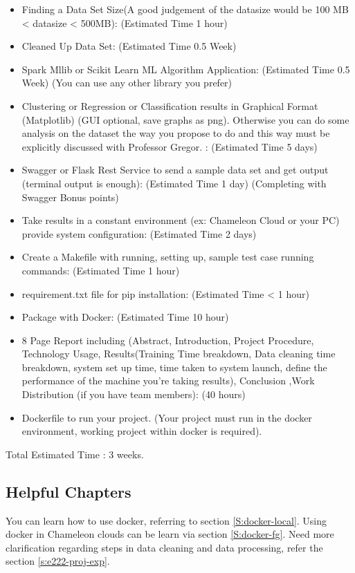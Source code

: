 \begin{itemize}
\item Finding a Data Set Size(A good judgement of the datasize would
  be 100 MB < datasize < 500MB): (Estimated Time 1 hour)
\item Cleaned Up Data Set: (Estimated Time 0.5 Week)
\item Spark Mllib or Scikit Learn ML Algorithm Application: (Estimated
  Time 0.5 Week) (You can use any other library you prefer)
\item Clustering or Regression or Classification results in Graphical
  Format (Matplotlib) (GUI optional, save graphs as png). Otherwise
  you can do some analysis on the dataset the way you propose to do
  and this way must be explicitly discussed with Professor Gregor. :
  (Estimated Time 5 days)
\item Swagger or Flask  Rest Service  to send  a sample data  set and  get output
  (terminal output is enough): (Estimated Time 1 day) (Completing with
  Swagger Bonus points)
\item Take results in a constant environment (ex: Chameleon Cloud or
  your PC) provide system configuration: (Estimated Time 2 days)
\item Create a Makefile with running, setting up, sample test case
  running commands: (Estimated Time 1 hour)
\item requirement.txt file for pip installation: (Estimated Time < 1 hour)
\item Package with Docker: (Estimated Time 10 hour)
\item 8 Page Report including (Abstract, Introduction, Project
  Procedure, Technology Usage, Results(Training Time breakdown, Data
  cleaning time breakdown, system set up time, time taken to system
  launch, define the performance of the machine you're taking
  results), Conclusion ,Work Distribution (if you have team members): (40 hours)
\item Dockerfile to run your project. (Your project must run in the
  docker environment, working project within docker is required).
\end{itemize}

Total Estimated Time : 3 weeks.

\subsection{Helpful Chapters}

You can learn how to use docker, referring to section
\ref{S:docker-local}.  Using docker in Chameleon clouds can be learn
via section \ref{S:docker-fg}.  Need more clarification regarding
steps in data cleaning and data processing, refer the section
\ref{s:e222-proj-exp}.

